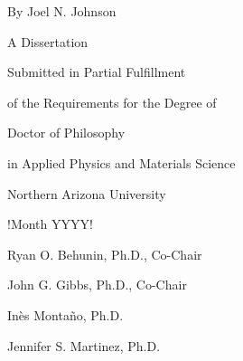 \begin{centering}
\begin{large}
\begin{spacing}{1.8}

\vspace*{\baselineskip}

\dissertationTitle{}

\thispagestyle{empty} %

\vspace{\baselineskip}

By Joel N. Johnson


A Dissertation

Submitted in Partial Fulfillment

of the Requirements for the Degree of


Doctor of Philosophy

in Applied Physics and Materials Science

\vspace{\baselineskip}

Northern Arizona University

!Month YYYY!

\vspace{2\baselineskip}


Ryan O. Behunin, Ph.D., Co-Chair

John G. Gibbs, Ph.D., Co-Chair

Inès Montaño, Ph.D.

Jennifer S. Martinez, Ph.D.

\end{spacing}
\end{large}
\end{centering}
